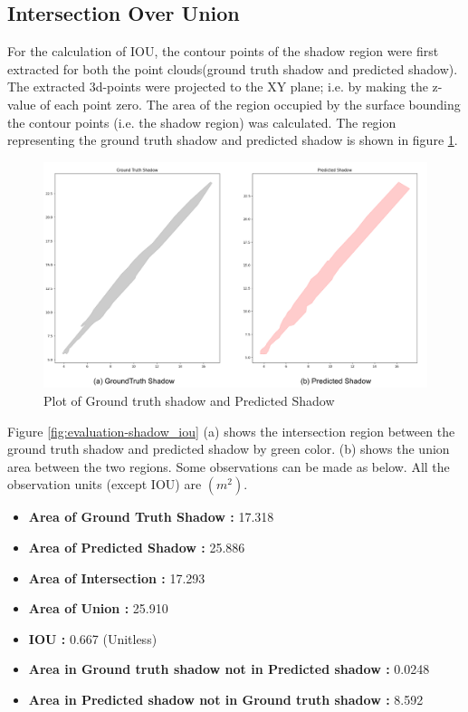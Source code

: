 \subsection{Intersection Over Union}
For the calculation of IOU, the contour points of the shadow region were first extracted for both the point clouds(ground truth shadow and predicted shadow). The extracted 3d-points were projected to the XY plane; i.e. by making the z-value of each point zero. The area of the region occupied by the surface bounding the contour points (i.e. the shadow region) was calculated. The region representing the ground truth shadow and predicted shadow is shown in figure \ref{fig:evaluation-shadow_gt_pred}.
\begin{figure}[htbp]
    \centering
    \includegraphics[width=1\linewidth]{97_graphics//evaluation/shadow_gt_pred.pdf}
    \caption{Plot of Ground truth shadow and Predicted Shadow}
    \label{fig:evaluation-shadow_gt_pred}
\end{figure}

Figure \ref{fig:evaluation-shadow_iou} (a) shows the intersection region between the ground truth shadow and predicted shadow by green color. (b) shows the union area between the two regions. Some observations can be made as below. All the observation units (except IOU) are \((m^2)\).
\begin{itemize}
    \item \textbf{Area of Ground Truth Shadow : }17.318
    \item \textbf{Area of Predicted Shadow : }25.886
    \item \textbf{Area of Intersection : }17.293
    \item \textbf{Area of Union : }25.910
    \item \textbf{IOU : }0.667 (Unitless)
    \item \textbf{Area in Ground truth shadow not in Predicted shadow : }0.0248
    \item \textbf{Area in Predicted shadow not in Ground truth shadow : }8.592
\end{itemize}

